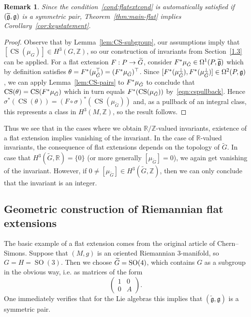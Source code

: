 \documentclass[10pt,a4paper]{amsart}
\renewcommand{\o}{\circ}
\renewcommand{\th}{\theta}
\newcommand{\si}{\sigma}
\newcommand{\Om}{\Omega}
\DeclareMathOperator{\CS}{CS}
\DeclareMathOperator{\SO}{SO}
\newcommand*{\R}{\mathbb{R}}
\newcommand{\Z}{\mathbb{Z}}
\newcommand{\tfg}{\widetilde{\mathfrak g}}
\newcommand{\fkg}{\mathfrak{g}}
\renewcommand*{\to}{\mathchoice{\longrightarrow}{\rightarrow}{\rightarrow}{\rightarrow}}
\let\oldtilde\tilde
\renewcommand*{\tilde}[1]{\mathchoice{\widetilde{#1}}{\widetilde{#1}}{\oldtilde{#1}}{\oldtilde{#1}}}
\newtheorem{rema}[theo]{Remark}
\theoremstyle{definition}\newtheorem{defi}[theo]{Definition}
\begin{document}
\begin{rema}
Since the condition~\eqref{cond:flatextcond} is automatically satisfied if $(\tilde{\fkg},\fkg)$ is a symmetric pair, Theorem~\ref{thm:main-flat} implies Corollary~\ref{cor:keystatement}.
\end{rema}

\begin{proof}
Observe that by Lemma~\ref{lem:CS-subgroup}, our assumptions imply that $[\CS(\mu_G)]\in H^3(G,\Z)$, so our construction of invariants from Section~\ref{1.3} can be applied. For a flat extension $F: P\to \tilde G$, consider $F^*\mu_{\tilde G}\in\Om^1(P,\tfg)$ which by definition satisfies $\theta=F^*(\mu_{\tilde{G}}^\top)=(F^*\mu_{\tilde G})^\top$. Since $[F^*(\mu_{\tilde G}^\perp),F^*(\mu_{\tilde G}^\perp)]\in\Om^2(P,\fkg)$, we can apply Lemma~\ref{lem:CS-pairs} to $F^*\mu_{\tilde G}$ to conclude that $\CS(\th)=\CS(F^*\mu_{\tilde G})$ which in turn equals $F^*(\CS(\mu_{\tilde G}))$ by~\eqref{eqn:cspullback}. Hence $\si^*(\CS(\theta))=(F\o\si)^*(\CS(\mu_{\widetilde{G}}))$ and, as a pullback of an integral class, this represents a class in $H^3(M,\Z)$, so the result follows.
\end{proof}

Thus we see that in the cases where we obtain $\R/\Z$-valued invariants, existence of a flat extension implies vanishing of the invariant. In the case of $\R$-valued invariants, the consequence of flat extensions depends on the topology of $\widetilde{G}$. In case that $H^3(\widetilde{G},\R)=\{0\}$ (or more generally $[\mu_{\widetilde{G}}]=0$), we again get vanishing of the invariant. However, if $0\neq [\mu_{\widetilde{G}}]\in H^3(\widetilde{G},\Z)$, then we can only conclude that the invariant is an integer.

\subsection{Geometric construction of Riemannian flat extensions}\label{1.6}

The basic example of a flat extension comes from the original article of Chern--Simons. Suppose that $(M,g)$ is an oriented Riemannian $3$-manifold, so $G=H=\SO(3)$. Then we choose $\tilde G=\SO(4)$, which contains $G$ as a subgroup in the obvious way, i.e. as matrices of the form
\[
\begin{pmatrix}
1 & 0
\\ 0 & A
\end{pmatrix}.
\]
One immediately verifies that for the Lie algebras this implies that $(\tfg,\fkg)$ is a symmetric pair.
\end{document}
